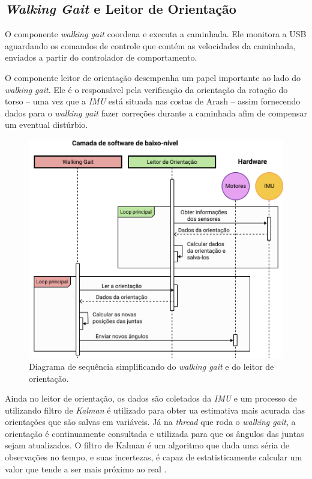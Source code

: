 \subsection{\textit{Walking Gait} e Leitor de Orientação}

O componente \textit{walking gait} coordena e executa a caminhada. Ele monitora a USB aguardando os comandos de controle que contém as velocidades da caminhada, enviados a partir do controlador de comportamento.

O componente leitor de orientação desempenha um papel importante ao lado do \textit{walking gait}. Ele é o responsável pela verificação da orientação da rotação do torso -- uma vez que a \textit{IMU} está situada nas costas de Arash -- assim fornecendo dados para o \textit{walking gait} fazer correções durante a caminhada afim de compensar um eventual distúrbio.

\begin{figure}[htb]
	\centering
	\includegraphics[scale=0.8]{imagens/svg/softwarearchitecture-lowlevel}
	\caption{Diagrama de sequência simplificando do \textit{walking gait} e do leitor de orientação.}
	\label{fig:softwarearchitecture:lowlevel}
\end{figure}

Ainda no leitor de orientação, os dados são coletados da \textit{IMU} e um processo de utilizando filtro de \textit{Kalman} é utilizado para obter ua estimativa mais acurada das orientações que são salvas em variáveis. Já na \textit{thread} que roda o \textit{walking gait}, a orientação é continuamente consultada e utilizada para que os ângulos das juntas sejam atualizados. O filtro de Kalman é um algoritmo que dada uma séria de observações no tempo, e suas incertezas, é capaz de estatisticamente calcular um valor que tende a ser mais próximo ao real \cite{grewal2014}.

